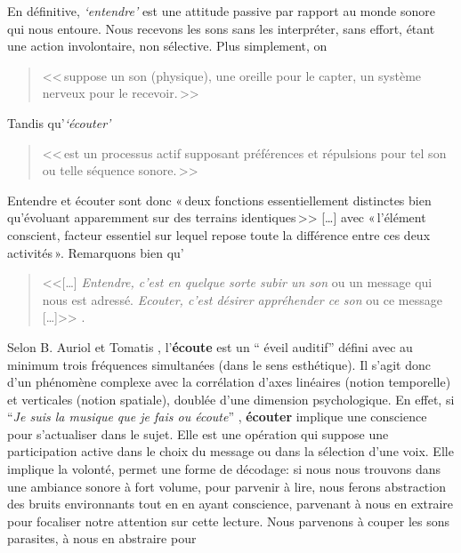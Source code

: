 En définitive, \emph{`entendre'} est une attitude passive par rapport au monde sonore
qui nous entoure. Nous recevons les sons sans les interpréter, sans
effort, étant une action involontaire, non
sélective. Plus simplement, on
\begin{quote}
	<<\,suppose un son (physique), une oreille
	pour le capter, un système nerveux pour le recevoir.\,>>\autocite[p. 2]{auriol:cle}
 \end{quote}
 Tandis qu'\textit{`écouter'}
\begin{quote}
	<<\,est un
	processus actif supposant préférences et répulsions pour tel son ou
	telle séquence sonore.\,>>\autocite[p. 2]{auriol:cle}

\end{quote}
Entendre et écouter sont donc  «\,deux
fonctions essentiellement distinctes bien qu'évoluant apparemment sur
des terrains iden\-ti\-ques\,>>
[\dots] avec «\,l'é\-lé\-ment cons\-cient, facteur essentiel sur lequel repose toute la
différence entre ces deux activités\,». \autocite[p. 122]{tomatis_oreille_1991}
Remarquons bien qu'
\begin{quote}

	<<[\ldots] \emph{Entendre, c'est en quelque sorte subir
		un son} ou un message qui nous est adressé. \emph{Ecouter, c'est désirer appréhender ce son} ou ce message [\ldots]>>
	\autocite [p. 111]{tomatis:education}.
\end{quote}
Selon B. Auriol \autocite[18] {auriol:cle} et Tomatis \autocite[52]
{tomatis:loreille}, l'\textbf{écoute} est un `` éveil auditif''  défini avec au
minimum trois
fréquences simultanées (dans le sens esthétique). Il s'agit donc d'un phénomène
complexe avec la corrélation d'axes
linéaires (notion temporelle) et verticales (notion spatiale), doublée d'une
dimension psychologique.
En effet, si \enquote{\emph{Je suis la musique que je fais ou écoute}}
\autocite [Ch. 1, p. 8]{viret:b}, \textbf{écouter} implique une conscience pour s'actualiser dans le sujet.
Elle est une opération
qui suppose une participation active dans le choix du message
ou dans la sélection d'une voix. Elle  implique la volonté,
permet une forme de décodage:
si nous nous trouvons dans une ambiance sonore à fort volume, pour
parvenir à lire, nous
ferons abstraction des bruits environnants tout en en ayant
conscience, parvenant à nous en extraire pour focaliser notre
attention sur cette lecture. Nous parvenons à couper les sons parasites, à nous en abstraire pour
